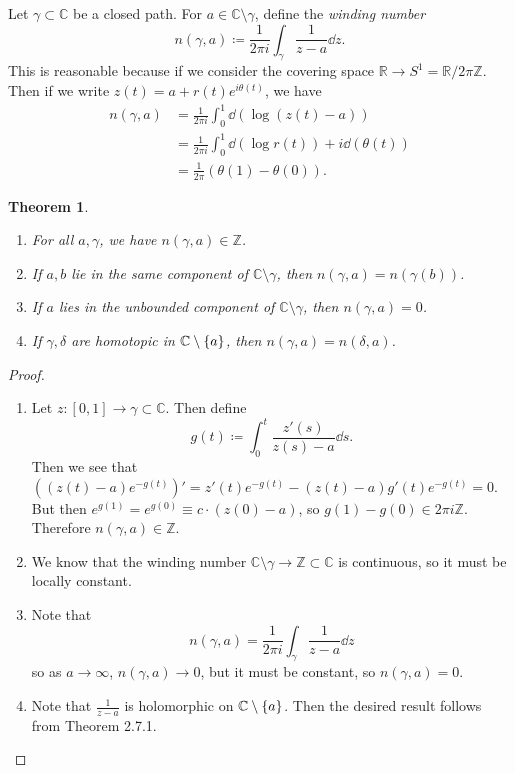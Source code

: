 \documentclass[leqno, openany]{memoir}
\newtheorem{thm}{Theorem}[section]
\theoremstyle{definition}
\theoremstyle{remark}
\theoremstyle{plain}
\theoremstyle{definition}
\theoremstyle{remark}
\newcommand{\R}{\mathbb{R}}
\newcommand{\C}{\mathbb{C}}
\newcommand{\Z}{\mathbb{Z}}
\begin{document}
Let $\gamma \subset \C$ be a closed path. For $a \in \C \setminus \gamma$,
define the \textit{winding number} \[ n(\gamma, a) \coloneqq \frac{1}{2 \pi i}
\int_{\gamma} \frac{1}{z-a} \dd{z}. \] This is reasonable because if we
consider the covering space $\R \to S^1 = \R/2 \pi \Z$. Then if we write $z(t)
= a + r(t) e^{i \theta(t)}$, we have \begin{align*} n(\gamma, a) &= \frac{1}{2
\pi i} \int_0^1 \dd(\log(z(t) - a)) \\ &= \frac{1}{2 \pi i} \int_0^1 \dd(\log
r(t)) + i \dd(\theta(t)) \\ &= \frac{1}{2 \pi} (\theta(1) - \theta(0)).
\end{align*}

\begin{thm}\leavevmode \begin{enumerate} \item For all $a, \gamma$, we have
    $n(\gamma, a) \in \Z$.  \item If $a, b$ lie in the same component of $\C
    \setminus \gamma$, then $n(\gamma, a) = n(\gamma(b))$.  \item If $a$ lies
    in the unbounded component of $\C \setminus \gamma$, then $n(\gamma, a) =
    0$.  \item If $\gamma, \delta$ are homotopic in $\C \setminus \qty{a}$,
    then $n(\gamma, a) = n(\delta, a)$.  \end{enumerate} \end{thm}

\begin{proof}\leavevmode \begin{enumerate} \item Let $z \colon [0,1] \to \gamma
    \subset \C$. Then define \[ g(t) \coloneqq \int_0^t \frac{z'(s)}{z(s) - a}
    \dd{s}. \] Then we see that ${((z(t) - a)e^{-g(t)})}' = z'(t) e^{-g(t)} -
    (z(t)-a) g'(t) e^{-g(t)} = 0$. But then $e^{g(1)} = e^{g(0)} \equiv c \cdot
    (z(0)-a)$, so $g(1) - g(0) \in 2 \pi i \Z$. Therefore $n(\gamma, a) \in
    \Z$.  \item We know that the winding number $\C \setminus \gamma \to \Z
    \subset \C$ is continuous, so it must be locally constant.  \item Note that
    \[ n(\gamma, a) = \frac{1}{2 \pi i} \int_{\gamma} \frac{1}{z-a} \dd{z} \]
    so as $a \to \infty$, $n(\gamma, a) \to 0$, but it must be constant, so
    $n(\gamma, a) = 0$.  \item Note that $\frac{1}{z-a}$ is holomorphic on $\C
    \setminus \qty{a}$. Then the desired result follows from Theorem 2.7.1.
    \qedhere \end{enumerate} \end{proof}
\end{document}
